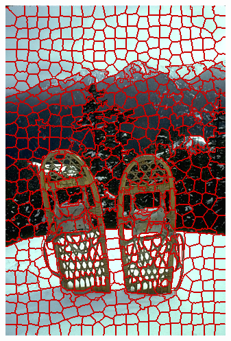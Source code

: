 \begin{figure}
{		\includegraphics[scale=\scalefivebsdtest]{pictures/bsd-test-4-orislic}
	}
	\subfigure{
}
\end{figure}
